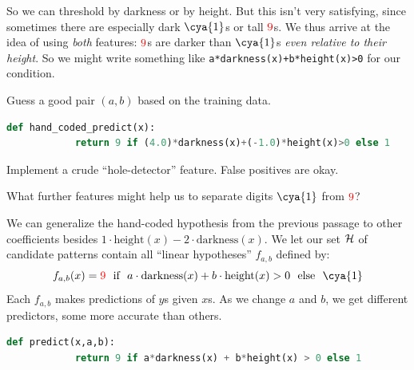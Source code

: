         So we can threshold by darkness or by height.  But this isn't very
        satisfying, since sometimes there are especially dark ${\cya{1}}$s or
        tall ${\red{9}}$s.
        We thus arrive at the idea of using \emph{both} features: ${\red{9}}$s
        are darker than ${\cya{1}}$s \emph{even relative to their
        height}.  So we might write something like
        \texttt{a*darkness(x)+b*height(x)>0} for
        our condition.
        \par\noindent
         {Guess a good pair $(a,b)$ based on the training data.}
        \begin{lstlisting}[language=Python, basicstyle=\footnotesize\ttfamily]
          def hand_coded_predict(x):
            return 9 if (4.0)*darkness(x)+(-1.0)*height(x)>0 else 1
        \end{lstlisting}
        \par\noindent
         {Implement a crude ``hole-detector'' feature.  False
        positives are okay.}
        \par\noindent
         {What further features might help us to separate digits
        ${\cya{1}}$ from ${\red{9}}$?}


        We can generalize the hand-coded hypothesis from the previous passage
        to other coefficients besides $1\cdot \text{height}(x) -
        2\cdot\text{darkness}(x)$.  We let our set $\mathcal{H}$ of candidate patterns
        contain all ``linear hypotheses'' $f_{a,b}$ defined by:
        $$
          f_{a,b}(x) = {\red{9}} \text{~~if~~} a\cdot\text{darkness}(x) + b\cdot\text{height}(x) > 0 \text{~~else~~} {\cya{1}}
        $$
        Each $f_{a,b}$ makes predictions of $y$s given $x$s.  As we change $a$
        and $b$, we get different predictors, some more accurate than others.

        \begin{lstlisting}[language=Python, basicstyle=\footnotesize\ttfamily]
          def predict(x,a,b):
            return 9 if a*darkness(x) + b*height(x) > 0 else 1
        \end{lstlisting}

